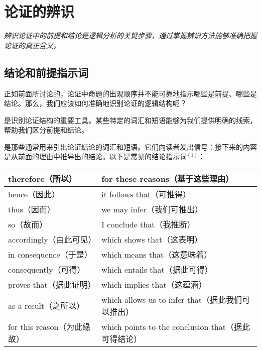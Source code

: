 \section{论证的辨识}

\begin{logicbox}[title=引言]
\textit{辨识论证中的前提和结论是逻辑分析的关键步骤，通过掌握辨识方法能够准确把握论证的真正含义。}
\end{logicbox}

\subsection{结论和前提指示词}

正如前面所讨论的，论证中命题的出现顺序并不能可靠地指示哪些是前提、哪些是结论。那么，我们应该如何准确地识别论证的逻辑结构呢？

是识别论证结构的重要工具。某些特定的词汇和短语能够为我们提供明确的线索，帮助我们区分前提和结论。

\begin{theorembox}[title=结论指示词]
是那些通常用来引出论证结论的词汇和短语。它们向读者发出信号：接下来的内容是从前面的理由中推导出的结论。以下是常见的结论指示词${}^{(1)}$：
\end{theorembox}

\begin{center}
\begin{tabular}{|l|l|}
\hline
therefore（所以） & for these reasons（基于这些理由） \\
\hline
hence（因此） & it follows that（可推得） \\
\hline
thus（因而） & we may infer（我们可推出） \\
\hline
so（故而） & I conclude that（我推断） \\
\hline
accordingly（由此可见） & which shows that（这表明） \\
\hline
in consequence（于是） & which means that（这意味着） \\
\hline
consequently（可得） & which entails that（据此可得） \\
\hline
proves that（据此证明） & which implies that（这蕴涵） \\
\hline
as a result（之所以） & which allows us to infer that（据此我们可以推出） \\
\hline
for this reason（为此缘故） & which points to the conclusion that（据此可得结论） \\
\hline
\end{tabular}
\end{center}

